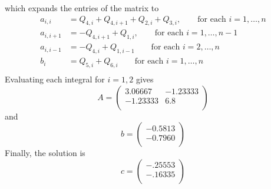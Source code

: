 \documentclass[12pt]{article}
\newcommand{\dd}[1]{\mathrm{d}{#1}}
\begin{document}
which expands the entries of the matrix to
\begin{equation}
  \begin{aligned}
    a_{i,i} &= Q_{4,i}+Q_{4,i+1}+Q_{2,i}+Q_{3,i},
    \qquad \text{for each } i=1,\ldots,n \\
    a_{i,i+1} &= -Q_{4,i+1}+Q_{1,i},
    \qquad \text{for each } i=1,\ldots,n-1 \\
    a_{i,i-1} &= -Q_{4,i}+Q_{1,i-1}
    \qquad \text{for each } i=2,\ldots,n \\
    b_{i} &= Q_{5,i}+Q_{6,i} \qquad \text{for each } i=1,\ldots,n \\
  \end{aligned}
\end{equation}
Evaluating each integral for $i=1,2$ gives
\begin{equation}
  \label{eq:2a-matrix}
A=
  \begin{pmatrix}
    3.06667 & -1.23333 \\
    -1.23333 & 6.8 \\
  \end{pmatrix}
\end{equation}
and 
\begin{equation}
  \label{eq:2a-matrix-b}
b=
  \begin{pmatrix}
    -0.5813 \\
    -0.7960\\
  \end{pmatrix}
\end{equation}
Finally, the solution is
\begin{equation}
  \label{eq:2a-matrix-c}
\boxed{c=
  \begin{pmatrix}
    -.25553 \\
    -.16335 \\
  \end{pmatrix}
}
\end{equation}
\pagebreak
\end{document}
